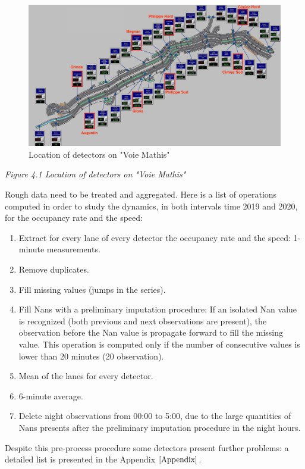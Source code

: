 \documentclass[11pt]{article}
\begin{document}
    \begin{figure}
    \centering
    \includegraphics{detector voie mathis.JPG}
    \caption{Location of detectors on "Voie Mathis"}
    \label{fig:4.1}
\end{figure}

\emph{\small Figure 4.1 Location of detectors on "Voie Mathis"}

    Rough data need to be treated and aggregated. Here is a list of
operations computed in order to study the dynamics, in both intervals
time 2019 and 2020, for the occupancy rate and the speed:

\begin{enumerate}
\def\labelenumi{\arabic{enumi}.}
\item
  Extract for every lane of every detector the occupancy rate and the
  speed: 1-minute measurements.
\item
  Remove duplicates.
\item
  Fill missing values (jumps in the series).
\item
  Fill Nans with a preliminary imputation procedure: If an isolated Nan
  value is recognized (both previous and next observations are present),
  the observation before the Nan value is propagate forward to fill the
  missing value. This operation is computed only if the number of
  consecutive values is lower than 20 minutes (20 observation).
\item
  Mean of the lanes for every detector.
\item
  6-minute average.
\item
  Delete night observations from 00:00 to 5:00, due to the large
  quantities of Nans presents after the preliminary imputation procedure
  in the night hours.
\end{enumerate}

Despite this pre-process procedure some detectors present further
problems: a detailed list is presented in the Appendix
\(\ref{Appendix}\).
\end{document}
